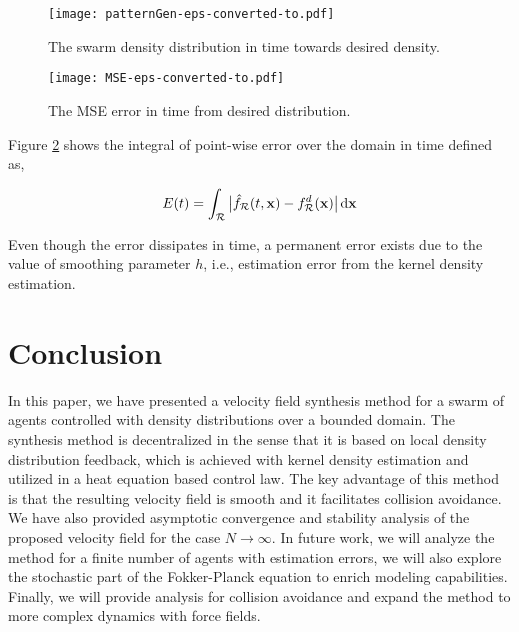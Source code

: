 \documentclass{ifacconf}
\newcommand{\Rconf}{{\mathcal R}}
\newcommand{\bx}{{\bf x}}
\begin{document}
\begin{figure}[hbt!]
\hspace{-5mm}\vspace{-1.5cm}\texttt{[image: patternGen-eps-converted-to.pdf]}
\caption{The swarm density distribution in time towards desired density.} 
\label{fig: pattern}
\end{figure}

\begin{figure}[hbt!]
\centering
\texttt{[image: MSE-eps-converted-to.pdf]}
\caption{The MSE error in time from desired distribution.} 
\label{fig: MSE}
\end{figure}

Figure \ref{fig: MSE} shows the integral of point-wise error over the domain in time defined as,

\begin{equation*}
	E(t) = \int_\Rconf \big|\hat{f}_\Rconf(t,\bx) - f_\Rconf^d(\bx)\big| \hspace{0.5mm} \textnormal{d}\bx
\end{equation*}

Even though the error dissipates in time, a permanent error exists due to the value of smoothing parameter $h$, i.e., estimation error from the kernel density estimation. 


\section{Conclusion}
In this paper, we have presented a velocity field synthesis method for a swarm of agents controlled with density distributions over a bounded domain. The synthesis method is decentralized in the sense that it is based on local density distribution feedback, which is achieved with kernel density estimation and utilized in a heat equation based control law. The key advantage of this method is that the resulting velocity field is smooth and it facilitates collision avoidance. We have also provided asymptotic convergence and stability analysis of the proposed velocity field for the case $N \rightarrow \infty$. In future work, we will analyze the method for a finite number of agents with estimation errors, we will also explore the stochastic part of the Fokker-Planck equation to enrich modeling capabilities. Finally, we will provide analysis for collision avoidance and expand the method to more complex dynamics with force fields. 
\end{document}
